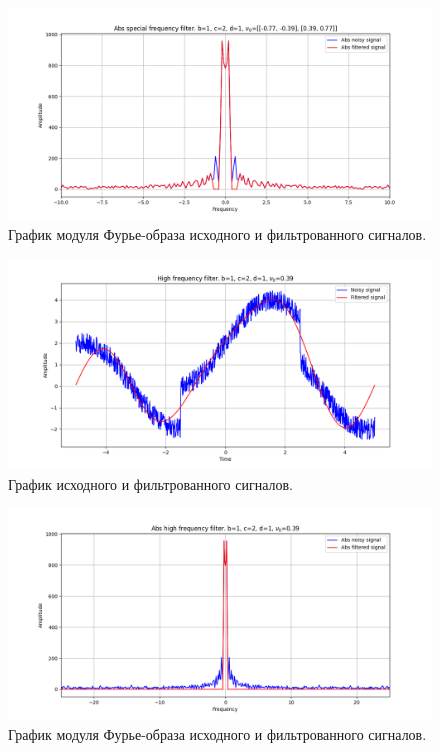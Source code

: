 \documentclass[a4paper, 12pt]{article}
\begin{document}
    \begin{figure}[!htb]
        \centering
        \includegraphics[scale=0.485]{1_abs_u_U_nospec.png}
        \captionsetup{skip=0pt}
        \caption{График модуля Фурье-образа исходного и фильтрованного сигналов.}
        \label{fig:fig72}
    \end{figure}
    \begin{figure}[!htb]
        \centering
        \includegraphics[scale=0.485]{1_1_u_flt_u_nospec.png}
        \captionsetup{skip=0pt}
        \caption{График исходного и фильтрованного сигналов.}
        \label{fig:fig73}
    \end{figure}
    \begin{figure}[!htb]
        \centering
        \includegraphics[scale=0.485]{1_1_abs_u_U_nospec.png}
        \captionsetup{skip=0pt}
        \caption{График модуля Фурье-образа исходного и фильтрованного сигналов.}
        \label{fig:fig74}
    \end{figure}
\end{document}
